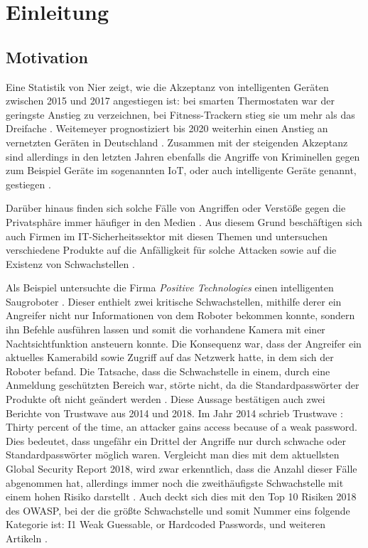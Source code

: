\chapter{Einleitung}

\section{Motivation}
Eine Statistik von Nier zeigt, wie die Akzeptanz von intelligenten Geräten zwischen 2015 und 2017 angestiegen ist: bei smarten Thermostaten war der geringste Anstieg zu verzeichnen, bei Fitness-Trackern stieg sie um mehr als das Dreifache \cite{nier_2017}. Weitemeyer prognostiziert bis 2020 weiterhin einen Anstieg an vernetzten Geräten in Deutschland \cite{weitemeyer_2018}.
Zusammen mit der steigenden Akzeptanz sind allerdings in den letzten Jahren ebenfalls die Angriffe von Kriminellen gegen zum Beispiel Geräte im sogenannten \ac{IoT}, oder auch \glqq intelligente Geräte\grqq{} genannt, gestiegen \cite{statista_2019}.

Darüber hinaus finden sich solche Fälle von Angriffen oder Verstöße gegen die Privatsphäre immer häufiger in den Medien \cite{holland_2016,it_verlag_informationstechnik_gmbh_2018}. Aus diesem Grund beschäftigen sich auch Firmen im IT-Sicherheitssektor mit diesen Themen und untersuchen verschiedene Produkte auf die Anfälligkeit für solche Attacken sowie auf die Existenz von Schwachstellen \cite{lorenz_2018,ao_kaspersky_lab_2018}.

Als Beispiel untersuchte die Firma \emph{Positive Technologies} einen intelligenten Saugroboter \cite{salmi_2017}.
Dieser enthielt zwei kritische Schwachstellen, mithilfe derer ein Angreifer nicht nur Informationen von dem Roboter bekommen konnte, sondern ihn Befehle ausführen lassen und somit die vorhandene Kamera mit einer Nachtsichtfunktion ansteuern konnte. Die Konsequenz war, dass der Angreifer ein aktuelles Kamerabild sowie Zugriff auf das Netzwerk hatte, in dem sich der Roboter befand. Die Tatsache, dass die Schwachstelle in einem, durch eine Anmeldung geschützten Bereich war, störte nicht, da die Standardpasswörter der Produkte oft nicht geändert werden \cite{positive_technologies_2018}.
Diese Aussage bestätigen auch zwei Berichte von Trustwave aus 2014 und 2018.
Im Jahr 2014 schrieb Trustwave \cite{trustwave_holdings_inc_2014}: \glqq Thirty percent of the time, an attacker gains access because of a weak password.\grqq{}
Dies bedeutet, dass ungefähr ein Drittel der Angriffe nur durch schwache oder Standardpasswörter möglich waren. Vergleicht man dies mit dem aktuellsten Global Security Report 2018, wird zwar erkenntlich, dass die Anzahl dieser Fälle abgenommen hat, allerdings immer noch die zweithäufigste Schwachstelle mit einem hohen Risiko darstellt \cite{trustwave_holdings_inc_2018}.
Auch deckt sich dies mit den Top 10 Risiken 2018 des \ac{OWASP}, bei der die größte Schwachstelle und somit Nummer eins folgende Kategorie ist: \glqq I1 Weak Guessable, or Hardcoded Passwords\grqq{}, und weiteren Artikeln \cite{guzman_2019,eckstein_2018}.

